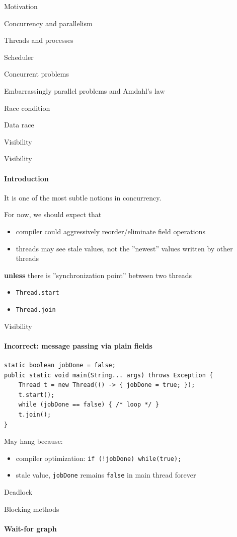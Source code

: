 \begin{section}{Motivation}
\begin{section}{Concurrency and parallelism}
\begin{section}{Threads and processes}
\begin{section}{Scheduler}
\begin{section}{Concurrent problems}
\begin{subsection}{Embarrassingly parallel problems and Amdahl's law}
\begin{subsection}{Race condition}
\begin{subsection}{Data race}
\begin{subsection}{Visibility}
\showTOCSub


\begin{frame}{Visibility}
\framesubtitle{Introduction}

It is one of the most subtle notions in concurrency. 

\pause

For now, we should expect that 

\begin{itemize}
    \item compiler could aggressively reorder/eliminate field operations
    \item threads may see stale values, not the ''newest'' values written by other threads
\end{itemize}
\textbf{unless} there is ''synchronization point'' between two threads

\pause

\begin{itemize}
    \item \texttt{Thread.start}
    \item \texttt{Thread.join}
\end{itemize}

\end{frame}


\begin{frame}[fragile]{Visibility}
\framesubtitle{Incorrect: message passing via plain fields}

\begin{verbatim}
static boolean jobDone = false;
public static void main(String... args) throws Exception {
    Thread t = new Thread(() -> { jobDone = true; });
    t.start();
    while (jobDone == false) { /* loop */ }
    t.join();
}
\end{verbatim}

\pause

May hang because:
\begin{itemize}
    \item compiler optimization: \texttt{if (!jobDone) while(true); }
    \item stale value, \texttt{jobDone} remains \texttt{false} in main thread forever
\end{itemize}
\end{frame}


\begin{subsection}{Deadlock}
\showTOCSub


\begin{frame}[t,fragile]{Blocking methods}
\framesubtitle{Wait-for graph}


\end{frame}
\end{subsection}
\end{subsection}
\end{subsection}
\end{subsection}
\end{subsection}
\end{section}
\end{section}
\end{section}
\end{section}
\end{section}
